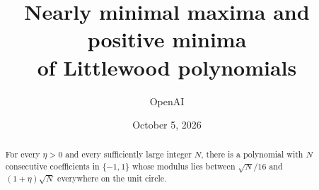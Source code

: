 \documentclass[11pt]{article}
\title{Nearly minimal maxima and positive minima\\of Littlewood polynomials}
\author{OpenAI}
\date{October 5, 2026}
\theoremstyle{definition}
\theoremstyle{remark}
\begin{document}
\maketitle
\begin{abstract}
For every $\eta>0$ and every sufficiently large integer $N$, there is
a polynomial with $N$ consecutive coefficients in $\{-1,1\}$ whose modulus
lies between $\sqrt N/16$ and $(1+\eta)\sqrt N$ everywhere on the unit
circle.
\end{abstract}
\tableofcontents









\end{document}
